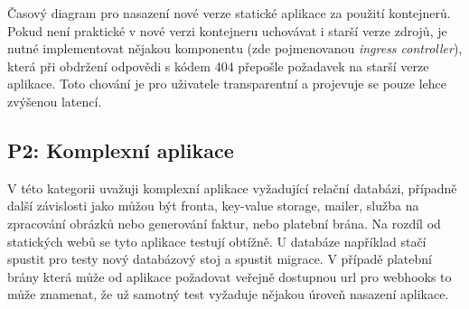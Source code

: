         \begin{iffigure}
            \centering
            \caption{Časový diagram pro nasazení nové verze statické aplikace za použití kontejnerů. Pokud není praktické v nové verzi kontejneru uchovávat i starší verze zdrojů, je nutné implementovat nějakou komponentu (zde pojmenovanou \textit{ingress controller}), která při obdržení odpovědi s  kódem 404 přepošle požadavek na starší verze aplikace. Toto chování je pro uživatele transparentní a projevuje se pouze lehce zvýšenou latencí.}
            \label{fig:static-deploy-container}
        \end{iffigure}

    \newpage
    \subsection{P2: Komplexní aplikace}
        V této kategorii uvažuji komplexní aplikace vyžadující relační databázi, případně další závislosti jako můžou být fronta, key-value storage, mailer, služba na zpracování obrázků nebo generování faktur, nebo platební brána. Na rozdíl od statických webů se tyto aplikace testují obtížně.
        U databáze například stačí spustit pro testy nový databázový stoj a spustit migrace. V případě platební brány která může od aplikace požadovat veřejně dostupnou url pro webhooks to může znamenat, že už samotný test vyžaduje nějakou úroveň nasazení aplikace.

